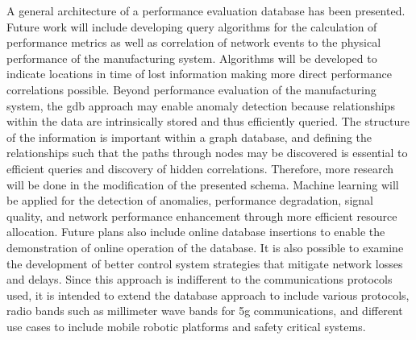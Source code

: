 A general architecture of a performance evaluation database has been presented.  Future work will include developing query algorithms for the calculation of performance metrics as well as correlation of network events to the physical performance of the manufacturing system.  Algorithms will be developed to indicate locations in time of lost information making more direct performance correlations possible.  Beyond performance evaluation of the manufacturing system, the \gls{gdb} approach may enable anomaly detection because relationships within the data are intrinsically stored and thus efficiently queried.  The structure of the information is important within a graph database, and defining the relationships such that the paths through nodes may be discovered is essential to efficient queries and discovery of hidden correlations.  Therefore, more research will be done in the modification of the presented schema.  Machine learning will be applied for the detection of anomalies, performance degradation, signal quality, and network performance enhancement through more efficient resource allocation.  Future plans also include online database insertions to enable the demonstration of online operation of the database.   It is also possible to examine the development of better control system strategies that mitigate network losses and delays.  Since this approach is indifferent to the communications  protocols used, it is intended to extend the database approach to include various protocols, radio bands such as millimeter wave bands for \gls{5g} communications, and different use cases to include mobile robotic platforms and safety critical systems.

